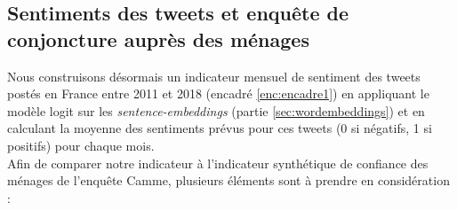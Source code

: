 \documentclass[11pt,french,french]{article}
\begin{document}
\hypertarget{sentiments-des-tweets-et-enquuxeate-de-conjoncture-aupruxe8s-des-muxe9nages}{%
\subsection{Sentiments des tweets et enquête de conjoncture auprès des ménages}\label{sentiments-des-tweets-et-enquuxeate-de-conjoncture-aupruxe8s-des-muxe9nages}}

Nous construisons désormais un indicateur mensuel de sentiment des tweets postés en France entre 2011 et 2018 (encadré \ref{enc:encadre1}) en appliquant le modèle logit sur les \emph{sentence-embeddings} (partie \ref{sec:wordembeddings}) et en calculant la moyenne des sentiments prévus pour ces tweets (0 si négatifs, 1 si positifs) pour chaque mois.\\
Afin de comparer notre indicateur à l'indicateur synthétique de confiance des ménages de l'enquête Camme, plusieurs éléments sont à prendre en considération :
\end{document}
